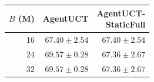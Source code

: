\begin{tabular}{@{}rrr@{}}
\toprule
$B$ (M) & AgentUCT & \shortstack{AgentUCT-\\StaticFull}\\
\midrule
16 & $67.40\pm2.54$ & $67.40\pm2.54$\\
24 & $69.57\pm0.28$ & $67.36\pm2.67$\\
32 & $69.57\pm0.28$ & $67.36\pm2.67$\\
\bottomrule
\end{tabular}
